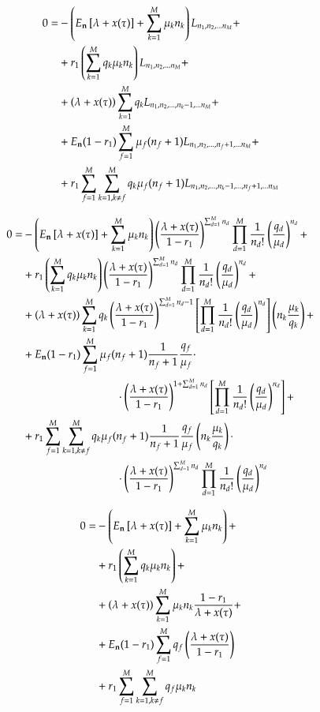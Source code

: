 \begin{equation}\begin{aligned}
    0 = 
    &-\left( {E_{\bold{n}}\left[ {\lambda + x(\tau)} \right] + \sum_{{k}=1}^{M}\mu_{k}{n}_{k}} \right)
        {L}_{{n}_1, {n}_2, ... {n}_{M}} + \\
    &+r_1 \left( {\sum_{{k}=1}^{M} q_{k}\mu_{k}{n}_{k}} \right) {L}_{{n}_1, {n}_2, ... {n}_{M}} + \\
    &+\left( {\lambda + x(\tau)} \right)\sum_{k=1}^{M}q_k {L}_{{n}_1, {n}_2, ... , {n}_{k} - 1, ... {n}_{M}}  + \\
    &+E_{\bold{n}}(1-r_1)\sum_{f=1}^{M} \mu_f (n_f + 1) {L}_{{n}_1, {n}_2, ... , {n}_{f} + 1, ... {n}_{M}} + \\
    &+r_1 \sum_{{f}=1}^{M} \sum_{{k}=1, {k} \neq {f}}^{M} 
        q_k \mu_f (n_f+1) {L}_{{n}_1, {n}_2, ... , {n}_{k} - 1, ... , {n}_{f} + 1, ... {n}_{M}} 
\end{aligned}\end{equation}

\begin{equation}\begin{aligned}
    0 = 
    &-\Q{\En\T{\lxt} + \allExecutionFullIntensity{n}{k}} \Ldefinition{n}{d} +  \\
    &+r_1 \Q{\allExecutionRelativeIntensity{n}{k}}  \Ldefinition{n}{d} +  \\
    &+\Q{\lxt}\sum_{k=1}^{M}  q_k \LminusDefinition{n}{d}{k} + \\
    &+\En(1-r_1)\sum_{f=1}^{M} 
        \mu_f (n_f+1) \frac{1}{n_f + 1}
        \executionAbsoluteReverseIntensity{f} \cdot  \\
        & \hspace{3cm} \cdot \Q{\LunityBase}^{1 + \sum_{d=1}^{M}n_d} 
        \T{\LuniqueStandart{n}{d}} + \\
    &+r_1 \feedbackSum{f}{k} 
        q_k \mu_f (n_f+1) \frac{1}{n_f + 1} 
        \executionAbsoluteReverseIntensity{f}
        \Q{n_k\executionAbsoluteIntensity{k}} \cdot  \\
        & \hspace{3cm} \cdot \Ldefinition{n}{d}   
\end{aligned}\end{equation}

\begin{equation}\begin{aligned}
    0 = 
    &-\left( {E_{\bold{n}}\left[ {\lambda + x(\tau)} \right] + \sum_{{k}=1}^{M}\mu_{k}{n}_{k}} \right)  + \\
    &+r_1 \left( {\sum_{{k}=1}^{M} q_{k}\mu_{k}{n}_{k}} \right) + \\
    &+\left( {\lambda + x(\tau)} \right)\sum_{k=1}^{M}\mu_k n_k \frac{1-r_1}{\lambda + x(\tau)} + \\
    &+E_{\bold{n}}(1-r_1)\sum_{f=1}^{M} q_f \left( {\frac{\lambda + x(\tau)}{1-r_1}} \right) \\
    &+r_1 \sum_{{f}=1}^{M} \sum_{{k}=1, {k} \neq {f}}^{M} q_f \mu_k n_k 
\end{aligned}\end{equation}

